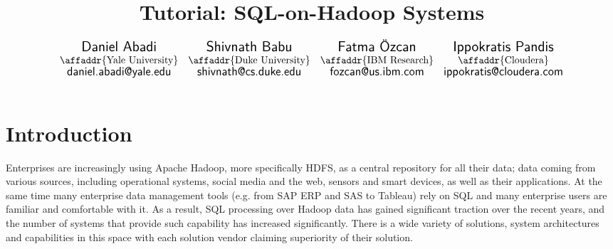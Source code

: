 \documentclass{vldb}
\begin{document}
\title{Tutorial: SQL-on-Hadoop Systems}


\author{
$
\begin{array}{cccc}
  \mbox{\Large \sf Daniel Abadi} &
  \mbox{\Large \sf Shivnath Babu} &
  \mbox{\Large \sf Fatma {\"O}zcan} &
  \mbox{\Large \sf Ippokratis Pandis}\\
  \mbox{\affaddr{Yale University}} &
  \mbox{\affaddr{Duke University}} &
  \mbox{\affaddr{IBM Research}} &
  \mbox{\affaddr{Cloudera}}\\
  \mbox{{\large \sf daniel.abadi@yale.edu}} &
  \mbox{{\large \sf shivnath@cs.duke.edu}} &
  \mbox{{\large \sf fozcan@us.ibm.com}} &
  \mbox{{\large \sf ippokratis@cloudera.com}}
\end{array}
$
\\
}
\maketitle




\section{Introduction}
Enterprises are increasingly using Apache Hadoop, more specifically HDFS, as a central repository for all their data;
data coming from various sources, including operational systems, social media and the web, sensors and smart devices, as well as their applications.
At the same time many enterprise data management tools (e.g. from SAP ERP and SAS to Tableau) rely on SQL and many enterprise users are familiar and comfortable with it.
As a result, SQL processing over Hadoop data has gained significant traction over the recent years, and the number of systems that provide such capability has increased significantly.
There is a wide variety of solutions, system architectures and capabilities in this space with each solution vendor claiming superiority of their solution.
\end{document}
